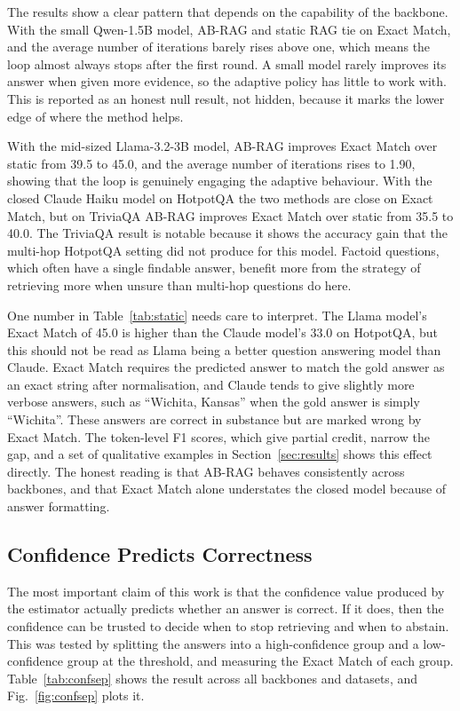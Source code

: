 \documentclass[conference,a4paper,10pt]{IEEEtran}
\begin{document}
The results show a clear pattern that depends on the capability of the backbone. With the
small Qwen-1.5B model, AB-RAG and static RAG tie on Exact Match, and the average number of
iterations barely rises above one, which means the loop almost always stops after the
first round. A small model rarely improves its answer when given more evidence, so the
adaptive policy has little to work with. This is reported as an honest null result, not
hidden, because it marks the lower edge of where the method helps.

With the mid-sized Llama-3.2-3B model, AB-RAG improves Exact Match over static from 39.5
to 45.0, and the average number of iterations rises to 1.90, showing that the loop is
genuinely engaging the adaptive behaviour. With the closed Claude Haiku model on HotpotQA
the two methods are close on Exact Match, but on TriviaQA AB-RAG improves Exact Match over
static from 35.5 to 40.0. The TriviaQA result is notable because it shows the accuracy
gain that the multi-hop HotpotQA setting did not produce for this model. Factoid
questions, which often have a single findable answer, benefit more from the strategy of
retrieving more when unsure than multi-hop questions do here.

One number in Table~\ref{tab:static} needs care to interpret. The Llama model's Exact
Match of 45.0 is higher than the Claude model's 33.0 on HotpotQA, but this should not be
read as Llama being a better question answering model than Claude. Exact Match requires
the predicted answer to match the gold answer as an exact string after normalisation, and
Claude tends to give slightly more verbose answers, such as ``Wichita, Kansas'' when the
gold answer is simply ``Wichita''. These answers are correct in substance but are marked
wrong by Exact Match. The token-level F1 scores, which give partial credit, narrow the
gap, and a set of qualitative examples in Section~\ref{sec:results} shows this effect
directly. The honest reading is that AB-RAG behaves consistently across backbones, and
that Exact Match alone understates the closed model because of answer formatting.

\subsection{Confidence Predicts Correctness}
The most important claim of this work is that the confidence value produced by the
estimator actually predicts whether an answer is correct. If it does, then the confidence
can be trusted to decide when to stop retrieving and when to abstain. This was tested by
splitting the answers into a high-confidence group and a low-confidence group at the
threshold, and measuring the Exact Match of each group. Table~\ref{tab:confsep} shows the
result across all backbones and datasets, and Fig.~\ref{fig:confsep} plots it.
\end{document}
